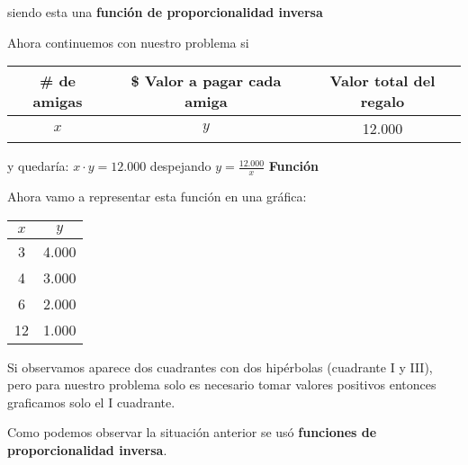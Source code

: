 \documentclass[12pt,a4paper]{article}
\begin{document}
siendo esta una \textbf{función de proporcionalidad inversa}

Ahora continuemos con nuestro problema si

\begin{center}
\begin{tabular}{|c|c|c|}
\hline
\textbf{\# de amigas} & \textbf{\$ Valor a pagar cada amiga} & \textbf{Valor total del regalo} \\
\hline
$x$ & $y$ & 12.000 \\
\hline
\end{tabular}
\end{center}

y quedaría: $x \cdot y = 12.000$ despejando $y = \frac{12.000}{x}$ \textbf{Función}

Ahora vamo a representar esta función en una gráfica:

\begin{center}
\begin{tabular}{|c|c|}
\hline
$x$ & $y$ \\
\hline
3 & 4.000 \\
4 & 3.000 \\
6 & 2.000 \\
12 & 1.000 \\
\hline
\end{tabular}
\end{center}

Si observamos aparece dos cuadrantes con dos hipérbolas (cuadrante I y III), pero para nuestro problema solo es necesario tomar valores positivos entonces graficamos solo el I cuadrante.

Como podemos observar la situación anterior se usó \textbf{funciones de proporcionalidad inversa}.

\vspace{5mm}

\end{document}
